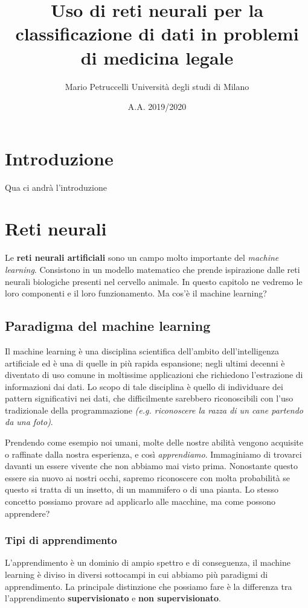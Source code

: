 \documentclass[12pt, twoside, letterpaper]{report}
\title{Uso di reti neurali per la classificazione di dati in problemi di medicina legale}
\author{Mario Petruccelli \cr Università degli studi di Milano}
\date{A.A. 2019/2020}
\begin{document}
	\begin{titlepage}
		
		\newpage
		\tableofcontents
	\end{titlepage}

	\chapter*{Introduzione} 
		Qua ci andrà l'introduzione

		\newpage		
	\chapter{Reti neurali}
		Le \textbf{reti neurali artificiali} sono un campo molto importante del \textit{machine learning}. Consistono in un modello matematico che prende ispirazione dalle reti neurali biologiche presenti nel cervello animale. In questo capitolo ne vedremo le loro componenti e il loro funzionamento. Ma cos'è il machine learning?

		\section{Paradigma del machine learning}
			Il machine learning è una disciplina scientifica dell'ambito dell'intelligenza artificiale ed è una di quelle in più rapida espansione; negli ultimi decenni è diventato di uso comune in moltissime applicazioni che richiedono l'estrazione di informazioni dai dati. Lo scopo di tale disciplina è quello di individuare dei pattern significativi nei dati, che difficilmente sarebbero riconoscibili con l'uso tradizionale della programmazione \textit{(e.g. riconoscere la razza di un cane partendo da una foto)}.  
			
			Prendendo come esempio noi umani, molte delle nostre abilità vengono acquisite o raffinate dalla nostra esperienza, e così \textit{apprendiamo}. Immaginiamo di trovarci davanti un essere vivente che non abbiamo mai visto prima. Nonostante questo essere sia nuovo ai nostri occhi, sapremo riconoscere con molta probabilità se questo si tratta di un insetto, di un mammifero o di una pianta. Lo stesso concetto possiamo provare ad applicarlo alle macchine, ma come possono apprendere? 
			
			\subsection{Tipi di apprendimento} L'apprendimento è un dominio di ampio spettro e di conseguenza, il machine learning è diviso in diversi sottocampi in cui abbiamo più paradigmi di apprendimento. La principale distinzione che possiamo fare è la differenza tra l'apprendimento \textbf{supervisionato} e \textbf{non supervisionato}.
			
\end{document}
